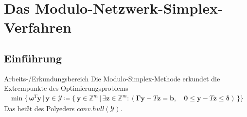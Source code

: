 \documentclass[accentcolor = tud11b, colorbacktitle, landscape, german, presentation, tudmathserif]{tudbeamer}
\newcommand{\R}{\ensuremath{\mathbb{R}}}
\newcommand{\Z}{\ensuremath{\mathbb{Z}}}
\newcommand{\mat}[1]{\boldsymbol{\mathbf{#1}}}
\renewcommand{\vec}[1]{\boldsymbol{\mathbf{#1}}}
\begin{document}
	
	\section{Das Modulo-Netzwerk-Simplex-Verfahren}
		\subsection{Einführung}
			\begin{frame}{Arbeits-/Erkundungsbereich}
				Die Modulo-Simplex-Methode erkundet die Extrempunkte des Optimierungsproblems
				\begin{gather*}
					\min \Big\{\, \vec{\omega}^T \vec{y} \,\big\vert\, \vec{y} \in \mathcal{Y}\coloneqq \big\{\, \vec{y} \in \Z^m \,\vert\, \exists \vec{z} \in \Z^m : ( \mat{\Gamma} \vec{y} - T\vec{z} = \vec{b}, \quad \vec{0} \leq \vec{y} - T\vec{z} \leq \vec{\delta} ) \,\big\} \Big\}
				\end{gather*}
				Das heißt des Polyeders \( \mathit{conv.hull}(\mathcal{Y}) \).
			\end{frame}
		
\end{document}
